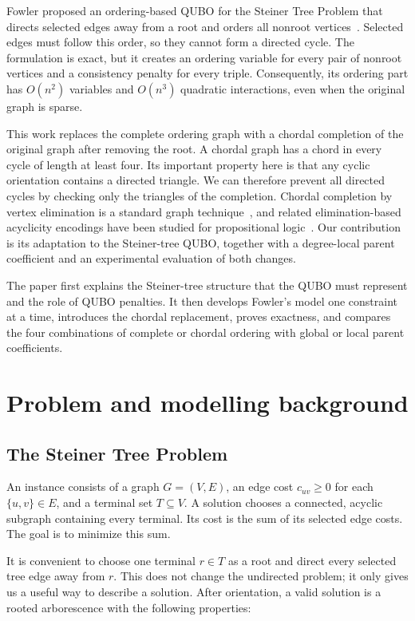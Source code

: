 \documentclass[10pt,a4paper]{article}
\begin{document}
Fowler proposed an ordering-based QUBO for the Steiner Tree Problem that
directs selected edges away from a root and orders all nonroot
vertices~\cite{fowler2017}. Selected edges must follow this order, so they
cannot form a directed cycle. The formulation is exact, but it creates an
ordering variable for every pair of nonroot vertices and a consistency
penalty for every triple. Consequently, its ordering part has $O(n^2)$
variables and $O(n^3)$ quadratic interactions, even when the original graph
is sparse.

This work replaces the complete ordering graph with a chordal completion of
the original graph after removing the root. A chordal graph has a chord in
every cycle of length at least four. Its important property here is that any
cyclic orientation contains a directed triangle. We can therefore prevent all
directed cycles by checking only the triangles of the completion. Chordal
completion by vertex elimination is a standard graph technique~\cite{rose1976},
and related elimination-based acyclicity encodings have been studied for
propositional logic~\cite{rankooh2022}. Our contribution is its adaptation to
the Steiner-tree QUBO, together with a degree-local parent coefficient and an
experimental evaluation of both changes.

The paper first explains the Steiner-tree structure that the QUBO must
represent and the role of QUBO penalties. It then develops Fowler's model one
constraint at a time, introduces the chordal replacement, proves exactness,
and compares the four combinations of complete or chordal ordering with
global or local parent coefficients.

\section{Problem and modelling background}

\subsection{The Steiner Tree Problem}

An instance consists of a graph $G=(V,E)$, an edge cost $c_{uv}\ge0$ for each
$\{u,v\}\in E$, and a terminal set $T\subseteq V$. A solution chooses a
connected, acyclic subgraph containing every terminal. Its cost is the sum of
its selected edge costs. The goal is to minimize this sum.

It is convenient to choose one terminal $r\in T$ as a root and direct every
selected tree edge away from $r$. This does not change the undirected problem;
it only gives us a useful way to describe a solution. After orientation, a
valid solution is a rooted arborescence with the following properties:
\end{document}
